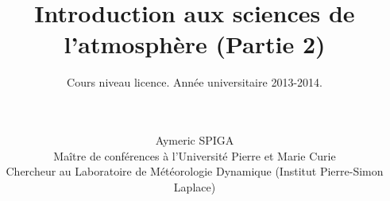 \documentclass[
	a4paper,
	DIV16,
	10pt,
	cleardoublepage=empty,
        twoside=yes,
        BCOR=8.25mm
	]{scrbook}
\begin{document}
\frontmatter

\subject{LP211}
\title{Introduction aux sciences de l'atmosphère (Partie 2)}
\subtitle{Cours niveau licence. Année universitaire 2013-2014.}
\author{~\\ ~\\
Aymeric SPIGA\\
\small Maître de conférences à l'Université Pierre et Marie Curie\\
\small Chercheur au Laboratoire de Météorologie Dynamique (Institut Pierre-Simon Laplace)
}
\date{}
\publishers{
\texttt{[image: /home/aymeric/Images/Logo/UPMC\_cart-blanc-Q\_7504-703-3.png]}\\
Contact: \\Copie et usage interdits sans autorisation explicite de l'auteur.
}

\dedication{Les chapitres 1, 2, 4 consistent en de multiples réorganisations, ajouts et modifications sur des notes existantes de Francis Codron que je souhaite remercier pour son aide. Les chapitres 3 et 5 sont entièrement originaux. Je remercie Jean-Baptiste Madeleine pour ses remarques constructives.\\ ~\\ ~\\ Dans l'éventualité où le lecteur trouverait des erreurs ou imprécisions dans ce cours, il est cordialement invité à les signaler à l'auteur à l'adresse \url{aymeric.spiga@upmc.fr}} \maketitle \tableofcontents

\mainmatter

%

%
\end{document}
